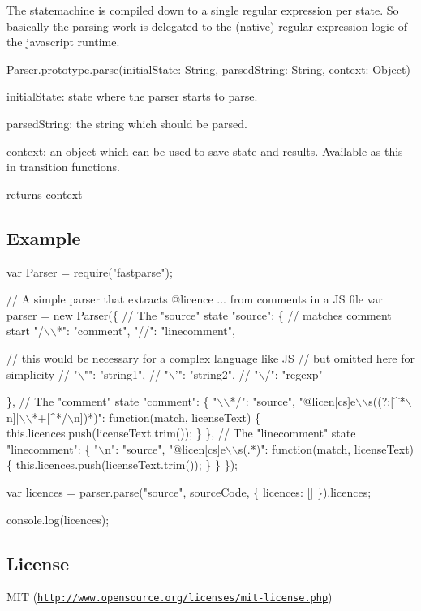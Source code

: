 The statemachine is compiled down to a single regular expression per state. So basically the parsing work is delegated to the (native) regular expression logic of the javascript runtime.


\begin{DoxyCode}
Parser.prototype.parse(initialState: String, parsedString: String, context: Object)
\end{DoxyCode}


{\ttfamily initial\+State}\+: state where the parser starts to parse.

{\ttfamily parsed\+String}\+: the string which should be parsed.

{\ttfamily context}\+: an object which can be used to save state and results. Available as {\ttfamily this} in transition functions.

returns {\ttfamily context}

\subsection*{Example}


\begin{DoxyCode}
var Parser = require("fastparse");

// A simple parser that extracts @licence ... from comments in a JS file
var parser = new Parser(\{
    // The "source" state
    "source": \{
        // matches comment start
        "/\(\backslash\)\(\backslash\)*": "comment",
        "//": "linecomment",

        // this would be necessary for a complex language like JS
        // but omitted here for simplicity
        // "\(\backslash\)"": "string1",
        // "\(\backslash\)'": "string2",
        // "\(\backslash\)/": "regexp"

    \},
    // The "comment" state
    "comment": \{
        "\(\backslash\)\(\backslash\)*/": "source",
        "@licen[cs]e\(\backslash\)\(\backslash\)s((?:[^*\(\backslash\)n]|\(\backslash\)\(\backslash\)*+[^*/\(\backslash\)n])*)": function(match, licenseText) \{
            this.licences.push(licenseText.trim());
        \}
    \},
    // The "linecomment" state
    "linecomment": \{
        "\(\backslash\)n": "source",
        "@licen[cs]e\(\backslash\)\(\backslash\)s(.*)": function(match, licenseText) \{
            this.licences.push(licenseText.trim());
        \}
    \}
\});

var licences = parser.parse("source", sourceCode, \{ licences: [] \}).licences;

console.log(licences);
\end{DoxyCode}


\subsection*{License}

M\+IT (\href{http://www.opensource.org/licenses/mit-license.php}{\tt http\+://www.\+opensource.\+org/licenses/mit-\/license.\+php}) 